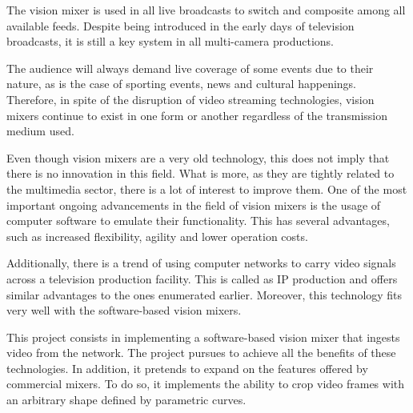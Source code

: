\documentclass[../main.tex]{subfiles}
\begin{document}
The vision mixer is used in all live broadcasts to switch and composite among all available feeds. Despite being introduced in the early days of television broadcasts, it is still a key system in all multi-camera productions.\newline

The audience will always demand live coverage of some events due to their nature, as is the case of sporting events, news and cultural happenings. Therefore, in spite of the disruption of video streaming technologies, vision mixers continue to exist in one form or another regardless of the transmission medium used.\newline

Even though vision mixers are a very old technology, this does not imply that there is no innovation in this field. What is more, as they are tightly related to the multimedia sector, there is a lot of interest to improve them. One of the most important ongoing advancements in the field of vision mixers is the usage of computer software to emulate their functionality. This has several advantages, such as increased flexibility, agility and lower operation costs.\newline

Additionally, there is a trend of using computer networks to carry video signals across a television production facility. This is called as IP production and offers similar advantages to the ones enumerated earlier. Moreover, this technology fits very well with the software-based vision mixers.\newline

This project consists in implementing a software-based vision mixer that ingests video from the network. The project pursues to achieve all the benefits of these technologies. In addition, it pretends to expand on the features offered by commercial mixers. To do so, it implements the ability to crop video frames with an arbitrary shape defined by parametric curves.\newline
\end{document}
